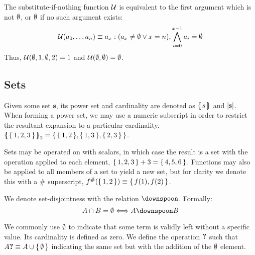 

The substitute-if-nothing function $\mathcal{U}$ is equivalent to the first argument which is not $\emptyset$, or $\emptyset$ if no such argument exists:
\begin{align}\label{eq:substituteifnothing}
  \mathcal{U}(a_0, \dots a_{n} ) \equiv a_{x} : (a_{x} \ne \emptyset \vee x = n), \bigwedge_{i=0}^{x-1} a_{i} = \emptyset
\end{align}
Thus, \eg $\mathcal{U}(\emptyset, 1, \emptyset, 2) = 1$ and $\mathcal{U}(\emptyset, \emptyset) = \emptyset$.

\subsection{Sets}\label{sec:sets}

Given some set $\mathbf{s}$, its power set and cardinality are denoted as $\protoset{s}$ and $\len{\mathbf{s}}$. When forming a power set, we may use a numeric subscript in order to restrict the resultant expansion to a particular cardinality. \Eg $\protoset{\set{1, 2, 3}}_2 = \set{ \set{1, 2}, \set{1, 3}, \set{2, 3} }$.

Sets may be operated on with scalars, in which case the result is a set with the operation applied to each element, \eg $\set{1, 2, 3} + 3 = \set{4, 5, 6}$. Functions may also be applied to all members of a set to yield a new set, but for clarity we denote this with a $\#$ superscript, \eg $f^{\#}(\set{1, 2}) \equiv \set{f(1), f(2)}$.

We denote set-disjointness with the relation $\disjoint$. Formally:
\begin{equation*}
  A \cap B = \none \Longleftrightarrow A \disjoint B
\end{equation*}

We commonly use $\emptyset$ to indicate that some term is validly left without a specific value. Its cardinality is defined as zero. We define the operation $\bm{?}$ such that $\optional{A} \equiv A \cup \set{\none}$ indicating the same set but with the addition of the $\emptyset$ element.


